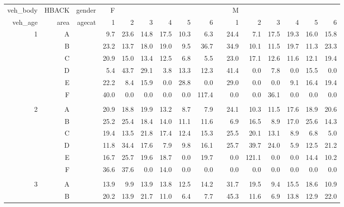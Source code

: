\documentclass[12pt]{article}
\begin{document}
\begin{sidewaysfigure} %
\begin{center}
\begin{tabular}{rr|rrrrrrrrrrrrrr}
\hline
veh\_body&HBACK& gender & F &&&&&&& M &&&&& \\
veh\_age & area & agecat & 1 & 2 & 3 & 4 & 5 & 6 & & 1 & 2 & 3 & 4 & 5 & 6 \\ \hline \hline
%
1 & A & & 9.7   & 23.6  & 14.8  & 17.5  & 10.3  & 6.3   && 24.4  & 7.1   & 17.5  & 19.3  & 16.0  & 15.8  \\
  & B & & 23.2  & 13.7  & 18.0  & 19.0  & 9.5   & 36.7  && 34.9  & 10.1  & 11.5  & 19.7  & 11.3  & 23.3  \\
  & C & & 20.9  & 15.0  & 13.4  & 12.5  & 6.8   & 5.5   && 23.0  & 17.1  & 12.6  & 11.6  & 12.1  & 19.4  \\
  & D & & 5.4   & 43.7  & 29.1  & 3.8   & 13.3  & 12.3  && 41.4  & 0.0   & 7.8   & 0.0   & 15.5  & 0.0   \\
  & E & & 22.2  & 8.4   & 15.9  & 0.0   & 28.8  & 0.0   && 29.0  & 0.0   & 0.0   & 9.1   & 16.4  & 19.4  \\
  & F & & 40.0  & 0.0   & 0.0   & 0.0   & 0.0   & 117.4 && 0.0   & 0.0   & 36.1  & 0.0   & 0.0   & 0.0   \\ & \\
2 & A & & 20.9  & 18.8  & 19.9  & 13.2  & 8.7   & 7.9   && 24.1  & 10.3  & 11.5  & 17.6  & 18.9  & 20.6  \\
  & B & & 25.2  & 25.4  & 18.4  & 14.0  & 11.1  & 11.6  && 6.9   & 16.5  & 8.9   & 17.0  & 25.6  & 14.3  \\
  & C & & 19.4  & 13.5  & 21.8  & 17.4  & 12.4  & 15.3  && 25.5  & 20.1  & 13.1  & 8.9   & 6.8   & 5.0   \\
  & D & & 11.8  & 34.4  & 17.6  & 7.9   & 9.8   & 16.1  && 25.7  & 39.7  & 24.0  & 5.9   & 12.5  & 21.2  \\
  & E & & 16.7  & 25.7  & 19.6  & 18.7  & 0.0   & 19.7  && 0.0   & 121.1 & 0.0   & 0.0   & 14.4  & 10.2  \\
  & F & & 36.6  & 37.6  & 0.0   & 14.0  & 0.0   & 0.0   && 0.0   & 0.0   & 0.0   & 0.0   & 0.0   & 0.0   \\ & \\
3 & A & & 13.9  & 9.9   & 13.9  & 13.8  & 12.5  & 14.2  && 31.7  & 19.5  & 9.4   & 15.5  & 18.6  & 10.9  \\
  & B & & 20.2  & 13.9  & 21.7  & 11.0  & 6.4   & 7.7   && 45.3  & 11.6  & 6.9   & 13.8  & 12.9  & 22.0  \\

\end{tabular}
\end{center}
\end{sidewaysfigure}
\end{document}

